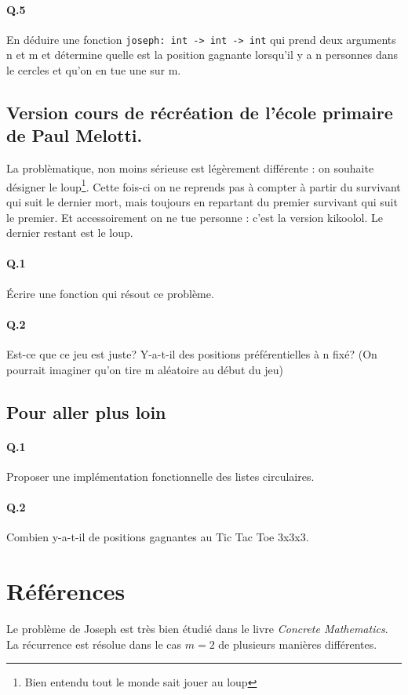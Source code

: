 \documentclass[10pt,a4paper]{article}
\begin{document}
\paragraph{Q.5} En déduire une fonction \texttt{joseph: int -> int -> int} qui prend deux arguments n et m et détermine quelle est la position gagnante
lorsqu'il y a n personnes dans le cercles et qu'on en tue une sur m.


\subsection{Version cours de récréation de l'école primaire de Paul Melotti.}
La problèmatique, non moins sérieuse est légèrement différente : on souhaite désigner le loup\footnote{Bien entendu tout le monde sait jouer au loup}.
Cette fois-ci on ne reprends pas à compter à partir du survivant qui suit le dernier mort, mais toujours en repartant du premier survivant qui suit le premier.
Et accessoirement on ne tue personne : c'est la version kikoolol. Le dernier restant est le loup.
\paragraph{Q.1} Écrire une fonction qui résout ce problème.
\paragraph{Q.2} Est-ce que ce jeu est juste? Y-a-t-il des positions préférentielles à n fixé? (On pourrait imaginer qu'on tire m aléatoire au début du jeu)
\subsection{Pour aller plus loin}
\paragraph{Q.1}Proposer une implémentation fonctionnelle des listes circulaires.
\paragraph{Q.2}Combien y-a-t-il de positions gagnantes au Tic Tac Toe
3x3x3. 
\section{Références}
Le problème de Joseph est très bien étudié dans le livre \emph{Concrete Mathematics}. La récurrence est résolue dans le cas $m=2$ de plusieurs manières différentes.
\end{document}
